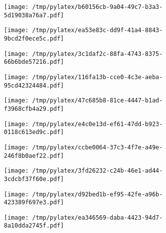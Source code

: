 \documentclass{article}
\begin{document}
\begin{figure}[htbp]
\begin{subfigure}[b]{.3\linewidth}
\texttt{[image: /tmp/pylatex/b60156cb-9a04-49c7-b3a3-5d19038a76a7.pdf]}
\end{subfigure}
\begin{subfigure}[b]{.3\linewidth}
\texttt{[image: /tmp/pylatex/ea53e83c-dd9f-41a4-8843-9bcd2f0ece5c.pdf]}
\end{subfigure}
\begin{subfigure}[b]{.3\linewidth}
\texttt{[image: /tmp/pylatex/3c1daf2c-88fa-4743-8375-66b6bde57216.pdf]}
\end{subfigure}
\begin{subfigure}[b]{.3\linewidth}
\texttt{[image: /tmp/pylatex/116fa13b-cce0-4c3e-aeba-95cd42324484.pdf]}
\end{subfigure}
\begin{subfigure}[b]{.3\linewidth}
\texttt{[image: /tmp/pylatex/47c685b8-81ce-4447-b1ad-f3968cfb4a29.pdf]}
\end{subfigure}
\begin{subfigure}[b]{.3\linewidth}
\texttt{[image: /tmp/pylatex/e4c0e13d-ef61-47dd-b923-0118c613ed9c.pdf]}
\end{subfigure}
\begin{subfigure}[b]{.3\linewidth}
\texttt{[image: /tmp/pylatex/ccbe0064-37c3-4f7e-a49e-246f8b0aef22.pdf]}
\end{subfigure}
\begin{subfigure}[b]{.3\linewidth}
\texttt{[image: /tmp/pylatex/3fd26232-c24b-46e1-ad44-3cdcbf37f60e.pdf]}
\end{subfigure}
\begin{subfigure}[b]{.3\linewidth}
\texttt{[image: /tmp/pylatex/d92bed1b-ef95-42fe-a96b-423389f697e3.pdf]}
\end{subfigure}
\begin{subfigure}[b]{.3\linewidth}
\texttt{[image: /tmp/pylatex/ea346569-daba-4423-94d7-8a10dda2745f.pdf]}
\end{subfigure}
\end{figure}
\end{document}

